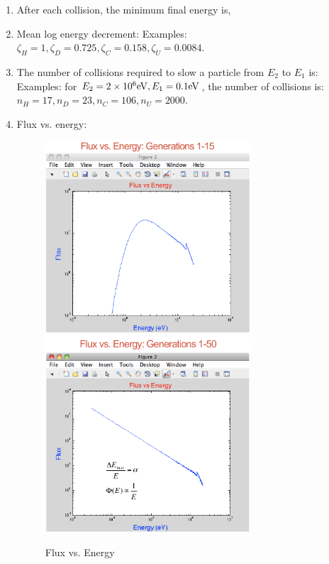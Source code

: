 \documentclass{school-22.211-notes}
\begin{document}
\begin{enumerate}
\item After each collision, the minimum final energy is,

\item Mean log energy decrement:
Examples: $\zeta_{H} = 1, \zeta_D = 0.725, \zeta_C = 0.158, \zeta_U = 0.0084$.  

\item The number of collisions required to slow a particle from $E_2$ to $E_1$ is: 
Examples: for $E_2 = 2\times 10^6 \mathrm{eV}, E_1 = 0.1 \mathrm{eV}$, the number of collisions is: $n_H = 17, n_D = 23, n_C = 106, n_U = 2000$. 

\item Flux vs. energy:
\begin{figure}[ht]
  \centering
  \includegraphics[width=3in]{images/sl-d/flux-vs-energy-1.png}
  \includegraphics[width=3in]{images/sl-d/flux-vs-energy-2.png}
  \caption{Flux vs. Energy} \label{fve}
\end{figure}


\end{enumerate}
\end{document}

